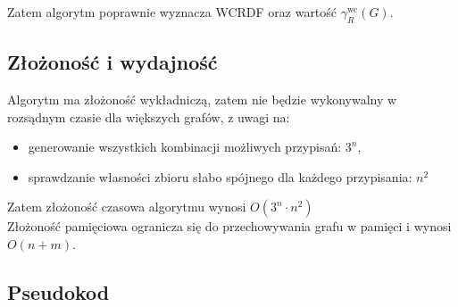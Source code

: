 Zatem algorytm poprawnie wyznacza WCRDF oraz wartość $\gamma^{\text{wc}}_R(G)$.

\subsection{Złożoność i wydajność}

Algorytm ma złożoność wykładniczą, zatem nie będzie wykonywalny w rozsądnym czasie dla większych grafów, z uwagi na:
\begin{itemize}
    \item generowanie wszystkich kombinacji możliwych przypisań: $3^n$,
    \item sprawdzanie własności zbioru słabo spójnego dla każdego przypisania: $n^2$
\end{itemize}

Zatem złożoność czasowa algorytmu wynosi $O(3^n \cdot n^2)$\\
Złożoność pamięciowa ogranicza się do przechowywania grafu w pamięci i wynosi $O(n + m)$.

\subsection{Pseudokod}

